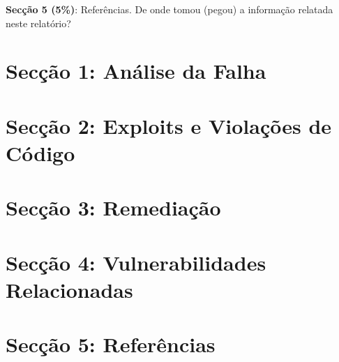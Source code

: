 \documentclass{article}
\begin{document}
\begin{center}
\setlength{\fboxrule}{1.5pt}
\end{center} 

\noindent
\textbf{Secção 5 (5\%)}: Referências. De onde tomou (pegou) a informação relatada neste
relatório? 



\section*{Secção 1: Análise da Falha}



\section*{Secção 2: Exploits e Violações de Código}



\section*{Secção 3: Remediação}



\section*{Secção 4: Vulnerabilidades Relacionadas}



\section*{Secção 5: Referências}
\end{document}
